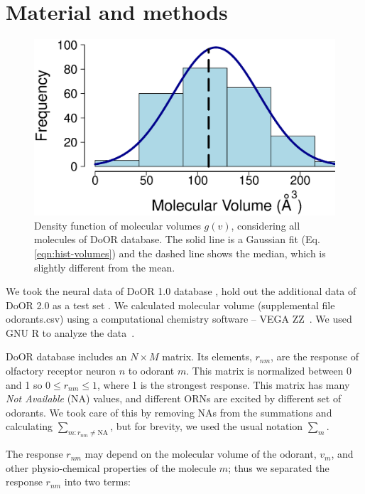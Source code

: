 \documentclass[fleqn,11pt]{wlscirep}
\begin{document}
\section*{Material and methods}
\begin{figure}
	\centering
	\includegraphics[width=0.5 \textwidth]{hist-volumes}
	\caption{Density function of molecular volumes $g(v)$, considering all molecules of DoOR database. 
		The solid line is a Gaussian fit (Eq. \ref{eqn:hist-volumes}) and the dashed line shows the median, 
		which is slightly different from  the mean.}
	\label{fig:hist-volumes}
\end{figure}
We took the neural data of DoOR 1.0 database \cite{Galizia2010}, hold out the additional data of DoOR 2.0 as a test set \cite{muench2015door,
de2010,dweck2015,dweck2013,marshall2010,montague2011,Gabler2013}. 
We calculated molecular volume (supplemental file odorants.csv) using a computational chemistry software -- VEGA ZZ~\cite{Pedretti2004}. 
We used  GNU R to analyze the data~\cite{Rlanguage}.

DoOR database includes an $N\times M$ matrix. 
Its elements, $r_{nm}$, are the response of olfactory receptor neuron $n$ to odorant $m$. 
This matrix is normalized between 0 and 1 so $0 \le r_{nm} \le 1$, where 1 is the strongest response.
This matrix has many {\it Not Available} (NA) values, 
and different ORNs are excited by different set of odorants. 
We took care of this by removing NAs from the summations and calculating $\sum_{m: r_{nm} \neq \text{NA}}$, 
but for brevity, we used the usual notation $\sum_m$.

The response $r_{nm}$ may depend on the molecular volume of the odorant, $v_m$, 
and other physio-chemical properties of the molecule $m$; 
thus we separated the response $r_{nm}$ into two terms:
\end{document}
